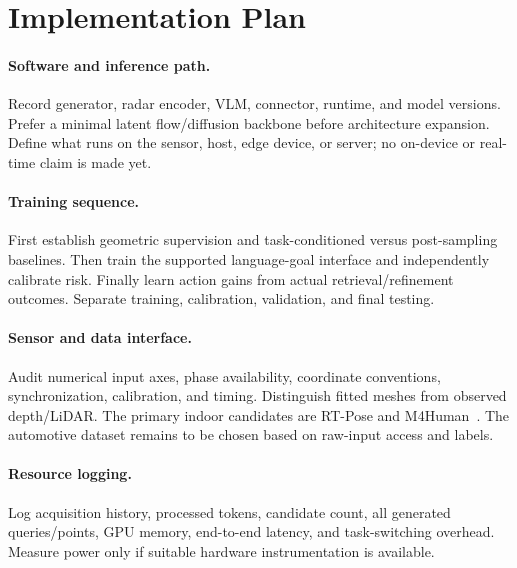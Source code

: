 \section{Implementation Plan}
\label{sec:implementation}
\paragraph{Software and inference path.}
Record generator, radar encoder, VLM, connector, runtime, and model versions. Prefer a minimal latent flow/diffusion backbone before architecture expansion. Define what runs on the sensor, host, edge device, or server; no on-device or real-time claim is made yet.

\paragraph{Training sequence.}
First establish geometric supervision and task-conditioned versus post-sampling baselines. Then train the supported language-goal interface and independently calibrate risk. Finally learn action gains from actual retrieval/refinement outcomes. Separate training, calibration, validation, and final testing.

\paragraph{Sensor and data interface.}
Audit numerical input axes, phase availability, coordinate conventions, synchronization, calibration, and timing. Distinguish fitted meshes from observed depth/LiDAR. The primary indoor candidates are RT-Pose and M4Human~\cite{rtpose2024,m4human2026}. The automotive dataset remains to be chosen based on raw-input access and labels.

\paragraph{Resource logging.}
Log acquisition history, processed tokens, candidate count, all generated queries/points, GPU memory, end-to-end latency, and task-switching overhead. Measure power only if suitable hardware instrumentation is available.
